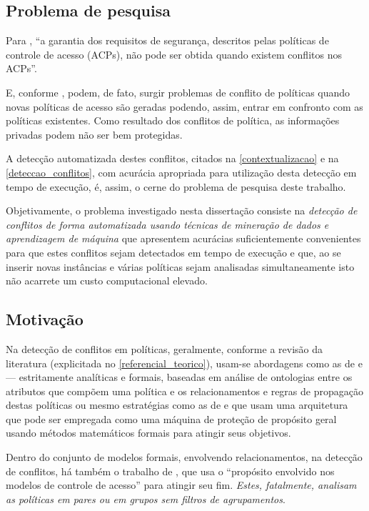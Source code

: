 \documentclass[
	12pt,				%
	openright,			%
	oneside,			%
	a4paper,			%
	english,			%
	french,				%
	spanish,			%
	brazil				%
	]{abntex2}
\begin{document}
\subsection{Problema de pesquisa}\label{problema}

Para , ``a garantia dos requisitos de segurança, descritos pelas políticas de controle de acesso (ACPs), não pode ser obtida quando existem conflitos nos ACPs''. 

E, conforme , podem, de fato, surgir problemas de conflito de políticas quando novas políticas de acesso são geradas podendo, assim, entrar em confronto com as políticas existentes. Como resultado dos conflitos de política, as informações privadas podem não ser bem protegidas.

A detecção automatizada destes conflitos, citados na \autoref{contextualizacao} e na \autoref{deteccao_conflitos}, com acurácia apropriada para utilização desta detecção em tempo de execução, é, assim, o cerne do problema de pesquisa deste trabalho. 

Objetivamente, o problema investigado nesta dissertação consiste na \textit{detecção de conflitos de forma automatizada usando técnicas de mineração de dados e aprendizagem de máquina} que apresentem acurácias suficientemente convenientes para que estes conflitos sejam detectados em tempo de execução e que, ao se inserir novas instâncias e várias políticas sejam analisadas simultaneamente isto não acarrete um custo computacional elevado.

\subsection{Motivação}\label{justificativa}
Na detecção de conflitos em políticas, geralmente, conforme a revisão da literatura (explicitada no \autoref{referencial_teorico}), usam-se abordagens como as de  e  --- estritamente analíticas e formais, baseadas em análise de ontologias entre os atributos que compõem uma política e os relacionamentos e regras de propagação destas políticas ou mesmo estratégias como as de  e  que usam uma arquitetura que pode ser empregada como uma máquina de proteção de propósito geral usando métodos matemáticos formais para atingir seus objetivos. 

Dentro do conjunto de modelos formais, envolvendo relacionamentos, na detecção de conflitos, há também o trabalho de , que usa o ``propósito envolvido nos modelos de controle de acesso'' para atingir seu fim. \textit{Estes, fatalmente, analisam as políticas em pares ou em grupos sem filtros de agrupamentos}.
\end{document}
